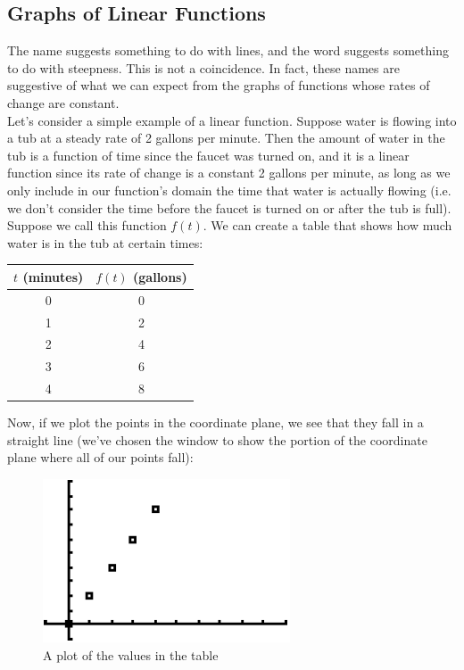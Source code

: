 %
%

\subsection{Graphs of Linear Functions}

The name  suggests something to do with lines, and the word  suggests something to do with steepness. This is not a coincidence. In fact, these names are suggestive of what we can expect from the graphs of functions whose rates of change are constant.\\

Let’s consider a simple example of a linear function. Suppose water is flowing into a tub at a steady rate of 2 gallons per minute. Then the amount of water in the tub is a function of time since the faucet was turned on, and it is a linear function since its rate of change is a constant 2 gallons per minute, as long as we only include in our function’s domain the time that water is actually flowing (i.e. we don’t consider the time before the faucet is turned on or after the tub is full).  Suppose we call this function $f(t)$. We can create a table that shows how much water is in the tub at certain times:

\begin{center}
	\begin{tabular}{c|c}
		$t$ (minutes) & $f(t)$ (gallons) \\
		\hline
		0 & 0 \\
		1 & 2 \\
		2 & 4 \\
		3 & 6 \\
		4 & 8 \\
	\end{tabular}
\end{center}

Now, if we plot the points in the coordinate plane, we see that they fall in a straight line (we’ve chosen the window to show the portion of the coordinate plane where all of our points fall):

\begin{figure}[H]
	\centering
	\includegraphics[scale=1.0]{Sections/LinearFunctionsandSlopeImages/Figure01.png}
	\caption{A plot of the values in the table}
\end{figure}

